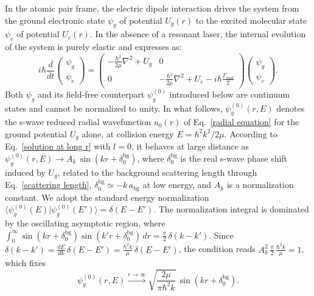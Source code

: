 In the atomic pair frame, the electric dipole interaction drives the system from the ground electronic state $\psi_g$ of potential $U_g(r)$ to the excited molecular state $\psi_e$ of potential $U_e(r)$. In the 
absence of a resonant laser, the internal evolution of the system is purely elastic and expresses as:
\begin{equation}
    i\hbar \frac{d}{dt}
    \begin{pmatrix}
        \psi_g\\
        \psi_e
    \end{pmatrix}
    =
    \begin{pmatrix}
        -\frac{\hbar^2}{2\mu}\nabla^2 + U_g & 0\\
        0 & -\frac{\hbar^2}{2\mu}\nabla^2 + U_e - i\hbar \frac{\Gamma_{mol}}{2}
    \end{pmatrix}
    \begin{pmatrix}
        \psi_g\\
        \psi_e
    \end{pmatrix}.
    \label{elastic evolution equation}
\end{equation}
Both $\psi_g$ and its field-free counterpart $\psi_g^{(0)}$ introduced below are
continuum states and cannot be normalized to unity. In what follows,
$\psi_g^{(0)}(r,E)$ denotes the s-wave reduced radial wavefunction
$u_0(r)$ of Eq.~\ref{radial equation} for the ground potential $U_g$ alone, at
collision energy $E=\hbar^2k^2/2\mu$. According to Eq.~\ref{solution at long r} with
$l=0$, it behaves at large distance as
$\psi_g^{(0)}(r,E)\to A_k\,\sin(kr+\delta_0^{\text{bg}})$, where
$\delta_0^{\text{bg}}$ is the real s-wave phase shift induced by $U_g$, related to the
background scattering length through Eq.~\ref{scattering length},
$\delta_0^{\text{bg}}\simeq -k\,a_{\text{bg}}$ at low energy, and $A_k$ is a
normalization constant. We adopt the standard energy normalization
\cite{bohn1997_prospects,jones_ultracold_2006}
$\langle\psi_g^{(0)}(E)\vert\psi_g^{(0)}(E')\rangle=\delta(E-E')$. The normalization
integral is dominated by the oscillating asymptotic region, where
$\int_0^\infty \sin(kr+\delta_0^{\text{bg}})\sin(k'r+\delta_0^{\text{bg}})\,dr
=\frac{\pi}{2}\,\delta(k-k')$. Since $\delta(k-k')=\frac{dE}{dk}\,\delta(E-E')
=\frac{\hbar^2k}{\mu}\,\delta(E-E')$, the condition reads
$A_k^2\,\frac{\pi}{2}\,\frac{\hbar^2 k}{\mu}=1$, which fixes
\begin{equation}
    \psi_g^{(0)}(r,E)\xrightarrow{r\to\infty}\sqrt{\frac{2\mu}{\pi\hbar^2 k}}\,
    \sin\!\left(kr+\delta_0^{\text{bg}}\right).
    \label{psi_g0 energy normalized}
\end{equation}
